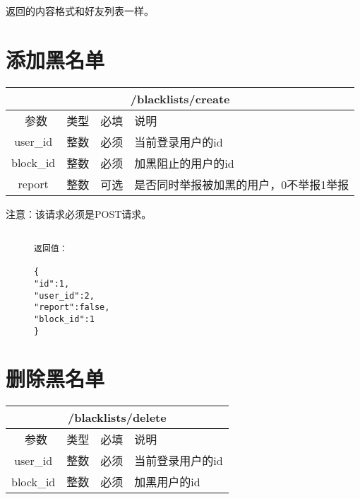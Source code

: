 \documentclass[cs4size]{ctexartutf8}
\begin{document}
返回的内容格式和好友列表一样。


\section{添加黑名单}

\begin{table}[H]
   \begin{center}
\begin{tabular}{|c|c|c|p{12cm}|}
\hline
\multicolumn{4}{|c|}{/blacklists/create} \\
\hline\hline
 \  参数  & 类型 & 必填 &  说明  \\
\hline
 user\_id  & 整数 & 必须 &  当前登录用户的id\\
\hline
 block\_id  & 整数 & 必须 &  加黑阻止的用户的id\\
 \hline
 report  & 整数 & 可选 &  是否同时举报被加黑的用户，0不举报1举报\\
\hline
\end{tabular}
   \end{center}
\end{table}

注意：该请求必须是POST请求。

\begin{figure}[H]
\begin{verbatim}

返回值：

{
"id":1,
"user_id":2,
"report":false,
"block_id":1
}

\end{verbatim}
\end{figure}



\section{删除黑名单}

\begin{table}[H]
   \begin{center}
\begin{tabular}{|c|c|c|p{12cm}|}
\hline
\multicolumn{4}{|c|}{/blacklists/delete} \\
\hline\hline
 \  参数  & 类型 & 必填 &  说明  \\
\hline
 user\_id  & 整数 & 必须 &  当前登录用户的id\\
\hline
 block\_id  & 整数 & 必须 &  加黑用户的id\\
\hline
\end{tabular}
   \end{center}
\end{table}
\end{document}
